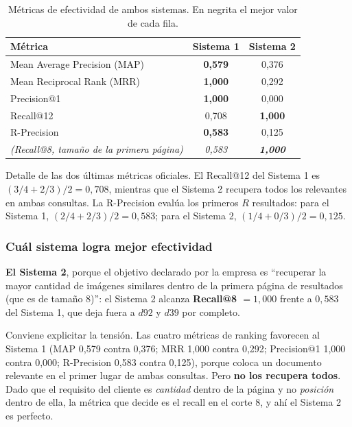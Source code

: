 \documentclass[11pt, a4paper]{article}
\begin{document}
\begin{table}[H]
\centering
\caption{Métricas de efectividad de ambos sistemas. En negrita el mejor valor de cada fila.}
\small
\renewcommand{\arraystretch}{1.25}
\begin{tabular}{@{}lcc@{}}
\toprule
\textbf{Métrica} & \textbf{Sistema 1} & \textbf{Sistema 2} \\
\midrule
Mean Average Precision (MAP) & \textbf{0,579} & 0,376 \\
Mean Reciprocal Rank (MRR)   & \textbf{1,000} & 0,292 \\
Precision@1                  & \textbf{1,000} & 0,000 \\
Recall@12                    & 0,708 & \textbf{1,000} \\
R-Precision                  & \textbf{0,583} & 0,125 \\
\midrule
\textit{(Recall@8, tamaño de la primera página)} & \textit{0,583} & \textbf{\textit{1,000}} \\
\bottomrule
\end{tabular}
\end{table}

Detalle de las dos últimas métricas oficiales. El Recall@12 del Sistema 1 es
$(3/4 + 2/3)/2 = 0{,}708$, mientras que el Sistema 2 recupera todos los relevantes en ambas
consultas. La R-Precision evalúa los primeros $R$ resultados: para el Sistema 1,
$(2/4 + 2/3)/2 = 0{,}583$; para el Sistema 2, $(1/4 + 0/3)/2 = 0{,}125$.

\subsubsection{Cuál sistema logra mejor efectividad}

\textbf{El Sistema 2}, porque el objetivo declarado por la empresa es ``recuperar la mayor cantidad
de imágenes similares dentro de la primera página de resultados (que es de tamaño 8)'': el Sistema 2
alcanza \textbf{Recall@8 $= 1{,}000$} frente a $0{,}583$ del Sistema 1, que deja fuera a $d92$ y
$d39$ por completo.

Conviene explicitar la tensión. Las cuatro métricas de ranking favorecen al Sistema 1
(MAP 0,579 contra 0,376; MRR 1,000 contra 0,292; Precision@1 1,000 contra 0,000; R-Precision 0,583
contra 0,125), porque coloca un documento relevante en el primer lugar de ambas consultas. Pero
\textbf{no los recupera todos}. Dado que el requisito del cliente es \textit{cantidad} dentro de la
página y no \textit{posición} dentro de ella, la métrica que decide es el recall en el corte 8, y
ahí el Sistema 2 es perfecto.
\end{document}
